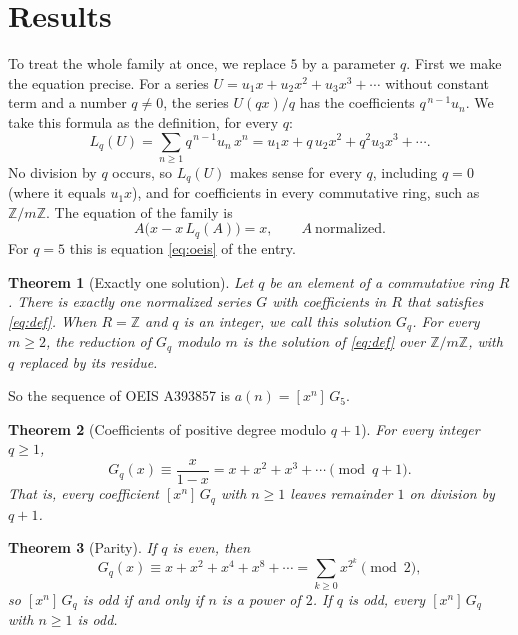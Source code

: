 \documentclass[11pt,a4paper]{article}
\newtheorem{theorem}{Theorem}[section]
\theoremstyle{definition}
\theoremstyle{remark}
\newcommand{\Z}{\mathbb{Z}}
\newcommand{\coeff}[2]{[x^{#1}]\,#2}
\begin{document}
\section{Results}\label{sec:results}

To treat the whole family at once, we replace $5$ by a parameter $q$. First we make the equation
precise. For a series $U=u_1x+u_2x^2+u_3x^3+\cdots$ without constant term and a number $q\ne0$, the series $U(qx)/q$
has the coefficients $q^{\,n-1}u_n$. We take this formula as the definition, for every $q$:
\begin{equation}\label{eq:L}
L_q(U)=\sum_{n\ge1}q^{\,n-1}u_n\,x^n=u_1x+q\,u_2x^2+q^2u_3x^3+\cdots .
\end{equation}
No division by $q$ occurs, so $L_q(U)$ makes sense for every $q$, including $q=0$ (where it equals $u_1x$), and for
coefficients in every commutative ring, such as $\Z/m\Z$. The equation of the family is
\begin{equation}\label{eq:def}
A\bigl(x-x\,L_q(A)\bigr)=x,\qquad A\ \text{normalized}.
\end{equation}
For $q=5$ this is equation \eqref{eq:oeis} of the entry.

\begin{theorem}[Exactly one solution]\label{thm:exist}
Let $q$ be an element of a commutative ring $R$. There is exactly one normalized series $G$ with coefficients in $R$
that satisfies \eqref{eq:def}. When $R=\Z$ and $q$ is an integer, we call this solution $G_q$. For every $m\ge2$, the
reduction of $G_q$ modulo $m$ is the solution of \eqref{eq:def} over $\Z/m\Z$, with $q$ replaced by its residue.
\end{theorem}

So the sequence of OEIS A393857 is $a(n)=\coeff{n}{G_{5}}$.

\begin{theorem}[Coefficients of positive degree modulo $q+1$]\label{thm:mod}
For every integer $q\ge1$,
\[
G_q(x)\equiv\frac{x}{1-x}=x+x^2+x^3+\cdots\pmod{q+1}.
\]
That is, every coefficient $\coeff{n}{G_q}$ with $n\ge1$ leaves remainder $1$ on division by $q+1$.
\end{theorem}

\begin{theorem}[Parity]\label{thm:parity}
If $q$ is even, then
\[
G_q(x)\equiv x+x^2+x^4+x^8+\cdots=\sum_{k\ge0}x^{2^k}\pmod 2,
\]
so $\coeff{n}{G_q}$ is odd if and only if $n$ is a power of $2$. If $q$ is odd, every $\coeff{n}{G_q}$ with $n\ge1$
is odd.
\end{theorem}
\end{document}
